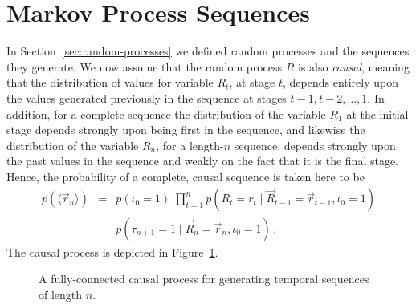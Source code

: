 \documentclass[a4paper]{article}
\begin{document}
\section{Markov Process Sequences}
\label{sec:markov-processes}
In Section~\ref{sec:random-processes} we defined random processes and the sequences they generate.
We now assume that the random process $R$ is also {\em causal}, meaning that the distribution of
values for variable $R_t$, at stage $t$, depends entirely upon the values generated previously
in the sequence at stages $t-1,t-2,\ldots,1$. In addition, for a complete sequence
the distribution of the variable $R_1$ at the initial stage depends strongly upon being first
in the sequence, and likewise the distribution of the variable $R_n$, for a length-$n$
sequence, depends strongly upon the past values in the sequence and weakly on the fact
that it is the final stage.
Hence, the probability of a complete, causal sequence is taken here to be
\begin{eqnarray}
p(\langle\vec{r}_{n}\rangle)
& = & 
p(\iota_0=1)\;
\prod_{t=1}^{n}
p(R_t=r_t\;|\;\vec{R}_{t-1}=\vec{r}_{t-1},\iota_0=1)
\nonumber\\&&
p(\tau_{n+1}=1\;|\;\vec{R}_{n}=\vec{r}_{n},\iota_0=1)
\,.
\label{eq:temporal-model}
\end{eqnarray}
The causal process is depicted in Figure~\ref{fig:causal-process}.
\begin{figure}[hbt]
\centering
{}
\caption{A fully-connected causal process for generating temporal sequences of length $n$.}
\label{fig:causal-process}
\end{figure}
\end{document}

